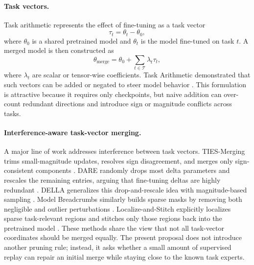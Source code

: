 \documentclass[11pt]{article}
\newcommand{\thetab}{\theta_0}
\newcommand{\taskvec}{\tau}
\newcommand{\tasks}{\mathcal{T}}
\begin{document}
\paragraph{Task vectors.}
Task arithmetic represents the effect of fine-tuning as a task vector
\begin{equation}
    \taskvec_t = \theta_t - \thetab,
\end{equation}
where $\thetab$ is a shared pretrained model and $\theta_t$ is the model fine-tuned on task $t$. A merged model is then constructed as
\begin{equation}
    \theta_{\mathrm{merge}} = \thetab + \sum_{t \in \tasks} \lambda_t \taskvec_t,
\end{equation}
where $\lambda_t$ are scalar or tensor-wise coefficients. Task Arithmetic demonstrated that such vectors can be added or negated to steer model behavior \citep{ilharco2022taskarithmetic}. This formulation is attractive because it requires only checkpoints, but naive addition can over-count redundant directions and introduce sign or magnitude conflicts across tasks.

\paragraph{Interference-aware task-vector merging.}
A major line of work addresses interference between task vectors. TIES-Merging trims small-magnitude updates, resolves sign disagreement, and merges only sign-consistent components \citep{yadav2023ties}. DARE randomly drops most delta parameters and rescales the remaining entries, arguing that fine-tuning deltas are highly redundant \citep{yu2023dare}. DELLA generalizes this drop-and-rescale idea with magnitude-based sampling \citep{deep2024della}. Model Breadcrumbs similarly builds sparse masks by removing both negligible and outlier perturbations \citep{davari2023breadcrumbs}. Localize-and-Stitch explicitly localizes sparse task-relevant regions and stitches only those regions back into the pretrained model \citep{he2024localize}. These methods share the view that not all task-vector coordinates should be merged equally. The present proposal does not introduce another pruning rule; instead, it asks whether a small amount of supervised replay can repair an initial merge while staying close to the known task experts.
\end{document}
